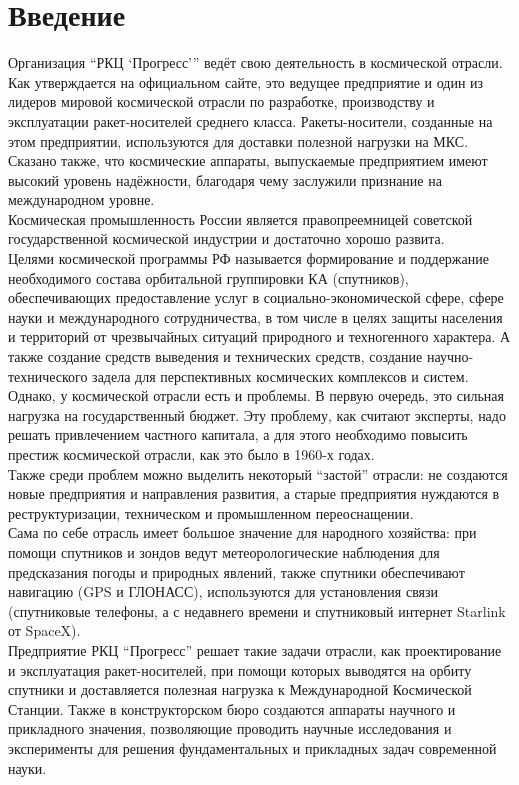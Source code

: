 \renewcommand{\baselinestretch}{1.5}
\section*{Введение}

Организация \enquote{РКЦ \enquote{Прогресс}} ведёт свою деятельность в космической отрасли.\\
Как утверждается на официальном сайте, это ведущее предприятие и один из лидеров мировой космической отрасли по разработке, производству и эксплуатации ракет-носителей среднего класса. Ракеты-носители, созданные на этом предприятии, используются для доставки полезной нагрузки на МКС. Сказано также, что космические аппараты, выпускаемые предприятием имеют высокий уровень надёжности, благодаря чему заслужили признание на международном уровне.\\
Космическая промышленность России является правопреемницей советской государственной космической индустрии и достаточно хорошо развита.\\
Целями космической программы РФ называется формирование и поддержание необходимого состава орбитальной группировки КА (спутников), обеспечивающих предоставление услуг в социально-экономической сфере, сфере науки и международного сотрудничества, в том числе в целях защиты населения и территорий от чрезвычайных ситуаций природного и техногенного характера. А также создание средств выведения и технических средств, создание научно-технического задела для перспективных космических комплексов и систем.\\
Однако, у космической отрасли есть и проблемы. В первую очередь, это сильная нагрузка на государственный бюджет. Эту проблему, как считают эксперты, надо решать привлечением частного капитала, а для этого необходимо повысить престиж космической отрасли, как это было в 1960-х годах.\\
Также среди проблем можно выделить некоторый \enquote{застой} отрасли: не создаются новые предприятия и направления развития, а старые предприятия нуждаются в реструктуризации, техническом и промышленном переоснащении.\\
Сама по себе отрасль имеет большое значение для народного хозяйства: при помощи спутников и зондов ведут метеорологические наблюдения для предсказания погоды и природных явлений, также спутники обеспечивают навигацию (GPS и ГЛОНАСС), используются для установления связи (спутниковые телефоны, а с недавнего времени и спутниковый интернет Starlink от SpaceX).\\
Предприятие {РКЦ \enquote{Прогресс}} решает такие задачи отрасли, как проектирование и эксплуатация ракет-носителей, при помощи которых выводятся на орбиту спутники и доставляется полезная нагрузка к Международной Космической Станции. Также в конструкторском бюро создаются аппараты научного и прикладного значения, позволяющие проводить научные исследования и эксперименты для решения фундаментальных и прикладных задач современной науки.


\pagebreak